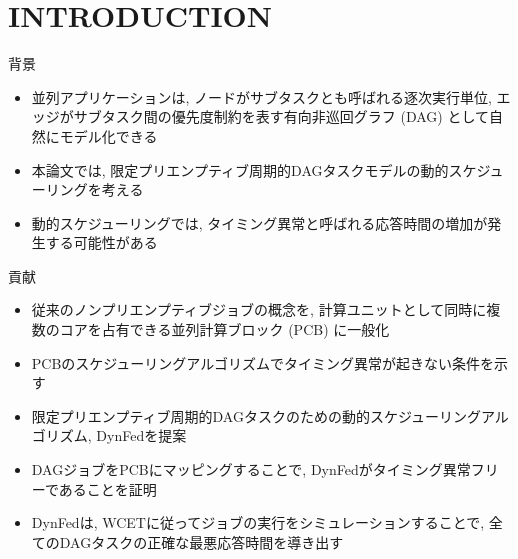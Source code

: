 
\section{INTRODUCTION}
\label{sec: introduction}

\begin{frame}{背景}
    \begin{itemize}
        \item 並列アプリケーションは, ノードがサブタスクとも呼ばれる逐次実行単位, エッジがサブタスク間の優先度制約を表す有向非巡回グラフ (DAG) として自然にモデル化できる
        \item 本論文では, 限定プリエンプティブ周期的DAGタスクモデルの動的スケジューリングを考える
        \item 動的スケジューリングでは, タイミング異常と呼ばれる応答時間の増加が発生する可能性がある
    \end{itemize}
\end{frame}

\begin{frame}{貢献}
    \begin{itemize}
        \item 従来のノンプリエンプティブジョブの概念を, 計算ユニットとして同時に複数のコアを占有できる並列計算ブロック (PCB) に一般化
        \item PCBのスケジューリングアルゴリズムでタイミング異常が起きない条件を示す
        \item 限定プリエンプティブ周期的DAGタスクのための動的スケジューリングアルゴリズム, DynFedを提案
        \item DAGジョブをPCBにマッピングすることで, DynFedがタイミング異常フリーであることを証明
        \item DynFedは, WCETに従ってジョブの実行をシミュレーションすることで, 全てのDAGタスクの正確な最悪応答時間を導き出す
    \end{itemize}
\end{frame}
